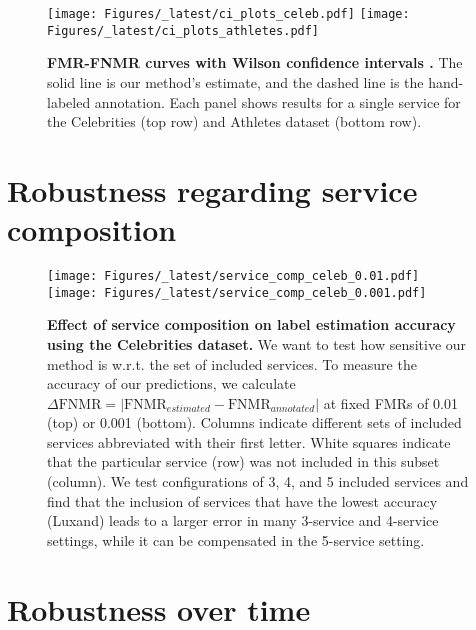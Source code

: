 \documentclass[10pt,twocolumn,letterpaper]{article}
\begin{document}
\begin{appendices}
\begin{figure*}[ht!]
    \centering
  \texttt{[image: Figures/\_latest/ci\_plots\_celeb.pdf]}
  \texttt{[image: Figures/\_latest/ci\_plots\_athletes.pdf]}
   \caption{\textbf{FMR-FNMR curves with Wilson confidence intervals \cite{fogliato2024confidence}.} The solid line is our method's estimate, and the dashed line is the hand-labeled annotation. Each panel shows results for a single service for the Celebrities (top row) and Athletes dataset (bottom row).}
  \label{fig:wilson-confidence}
\end{figure*}

\clearpage
\section{Robustness regarding service composition}
\label{sec:service-composition}

\begin{figure}[ht!]
    \centering
        \texttt{[image: Figures/\_latest/service\_comp\_celeb\_0.01.pdf]}
    \texttt{[image: Figures/\_latest/service\_comp\_celeb\_0.001.pdf]}
    \caption{{\bf Effect of service composition on label estimation accuracy using the Celebrities dataset.} We want to test how sensitive our method is w.r.t. the set of included services. To measure the accuracy of our predictions, we calculate \mbox{$\Delta \mathrm{FNMR} = |\mathrm{FNMR}_{estimated} - \mathrm{FNMR}_{annotated}|$} at fixed FMRs of 0.01 (top) or 0.001 (bottom).
    Columns indicate different sets of included services abbreviated with their first letter. White squares indicate that the particular service (row) was not included in this subset (column).
    We test configurations of 3, 4, and 5 included services and find that the inclusion of services that have the lowest accuracy (Luxand) leads to a larger error in many 3-service and 4-service settings, while it can be compensated in the 5-service setting.
    }
    
    \label{fig:service-comp}
\end{figure}

\newpage
\FloatBarrier
\section{Robustness over time}
\label{sec:over-time}


\end{appendices}
\end{document}

